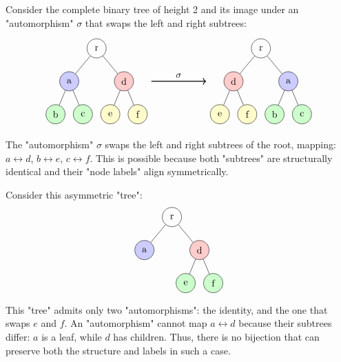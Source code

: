 \documentclass[a4paper,UKenglish,cleveref, autoref, thm-restate]{lipics-v2021}
\begin{document}
\begin{example}
	Consider the complete binary tree of height 2 and its image under an "automorphism" $\sigma$ that swaps the left and right subtrees:
	\[
		\begin{tikzpicture}[baseline={(current bounding box.center)}]
			\node (left) at (0,0) {
				\begin{tikzpicture}[level distance=1.2cm,
						every node/.style={draw, circle, minimum size=7mm},
						level 1/.style={sibling distance=2cm},
						level 2/.style={sibling distance=1cm}]
					\node {r}
					child { node[fill=blue!20] {a}
							child {node[fill=green!20] {b}}
							child {node[fill=green!20] {c}} }
					child { node[fill=red!20] {d}
							child {node[fill=yellow!20] {e}}
							child {node[fill=yellow!20] {f}} };
				\end{tikzpicture}
			};

			\node (right) at (6,0) {
				\begin{tikzpicture}[level distance=1.2cm,
						every node/.style={draw, circle, minimum size=7mm},
						level 1/.style={sibling distance=2cm},
						level 2/.style={sibling distance=1cm}]
					\node {r}
					child { node[fill=red!20] {d}
							child {node[fill=yellow!20] {e}}
							child {node[fill=yellow!20] {f}} }
					child { node[fill=blue!20] {a}
							child {node[fill=green!20] {b}}
							child {node[fill=green!20] {c}} };
				\end{tikzpicture}
			};

			\draw[->, thick] (2,0) -- (4,0) node[draw=none,midway, above] {$\sigma$};
		\end{tikzpicture}
	\]

	The "automorphism" $\sigma$ swaps the left and right subtrees of the root, mapping: $a \leftrightarrow d$, $b \leftrightarrow e$, $c \leftrightarrow f$.
	This is possible because both "subtrees" are structurally identical and their "node labels" align symmetrically.
\end{example}

\begin{remark}
	Consider this asymmetric "tree":
	\[
		\begin{tikzpicture}[level distance=1.2cm,
				every node/.style={draw, circle, minimum size=7mm},
				level 1/.style={sibling distance=2cm},
				level 2/.style={sibling distance=1cm}]
			\node {r}
			child { node[fill=blue!20] {a} }
			child { node[fill=red!20] {d}
					child {node[fill=green!20] {e}}
					child {node[fill=green!20] {f}} };
		\end{tikzpicture}
	\]

	This "tree" admits only two "automorphisms": the identity, and the one that swaps $e$ and $f$.
	An "automorphism" cannot map $a \leftrightarrow d$ because their subtrees differ: $a$ is a leaf, while $d$ has children.
	Thus, there is no bijection that can preserve both the structure and labels in such a case.
\end{remark}
\end{document}
